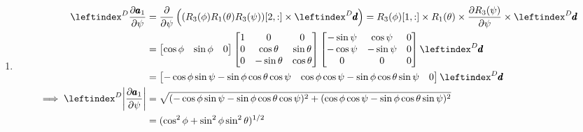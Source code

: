 \begin{enumerate}
\item
\begin{align*}
    \lx{^D}{\frac {\partial \pmb a_1}  {\partial \psi}} &=  \frac{\partial}{\partial \psi} \left((R_3(\phi)R_1(\theta) R_3(\psi))[2,:] \times \lx{^D}{\pmb d} \right)
    = R_3(\phi)[1,:] \times R_1(\theta) \times \frac{\partial R_3(\psi)}{\partial \psi} \times \lx{^D}{\pmb d}\\
    &= \bm{\cos \phi & \sin \phi  & 0}
      \bm{
            1 & 0 & 0\\
            0 & \cos \theta & \sin \theta\\
            0 & -\sin \theta & \cos \theta
        }
      \bm{
            -\sin \psi & \cos \psi  & 0\\
            -\cos \psi & -\sin \psi & 0\\
            0          & 0         & 0
        }\lx{^D}{\pmb d}\\
    &= \bm{-\cos \phi \sin \psi - \sin \phi \cos \theta \cos \psi &
          \cos \phi \cos \psi - \sin \phi \cos \theta \sin \psi &
          0} \lx{^D}{\pmb d}\\
     \implies \lx{^D}{\norm{\frac {\partial \pmb a_1}  {\partial \psi}}} &=
    \sqrt{(-\cos \phi \sin \psi - \sin \phi \cos \theta \cos \psi )^2 +
    (\cos \phi \cos \psi - \sin \phi \cos \theta \sin \psi )^2}\\
    &= (\cos^2 \phi + \sin^2\phi \sin^2 \theta)^{1/2}
\end{align*}

\end{enumerate}
